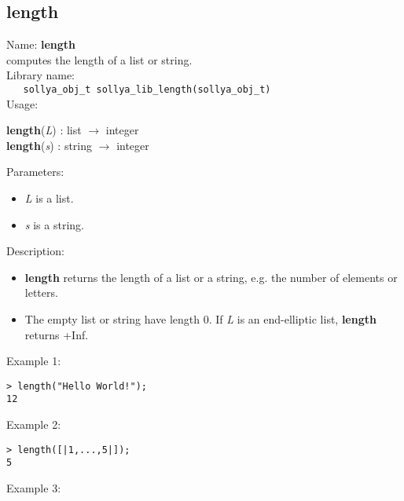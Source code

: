 \subsection{length}
\label{lablength}
\noindent Name: \textbf{length}\\
\phantom{aaa}computes the length of a list or string.\\[0.2cm]
\noindent Library name:\\
\verb|   sollya_obj_t sollya_lib_length(sollya_obj_t)|\\[0.2cm]
\noindent Usage: 
\begin{center}
\textbf{length}(\emph{L}) : \textsf{list} $\rightarrow$ \textsf{integer}\\
\textbf{length}(\emph{s}) : \textsf{string} $\rightarrow$ \textsf{integer}\\
\end{center}
Parameters: 
\begin{itemize}
\item \emph{L} is a list.
\item \emph{s} is a string.
\end{itemize}
\noindent Description: \begin{itemize}

\item \textbf{length} returns the length of a list or a string, e.g. the number of elements
   or letters.

\item The empty list or string have length 0.
   If \emph{L} is an end-elliptic list, \textbf{length} returns +Inf.
\end{itemize}
\noindent Example 1: 
\begin{center}\begin{minipage}{15cm}\begin{Verbatim}[frame=single,commandchars=\\\|\~]
> length("Hello World!");
12
\end{Verbatim}
\end{minipage}\end{center}
\noindent Example 2: 
\begin{center}\begin{minipage}{15cm}\begin{Verbatim}[frame=single,commandchars=\\\|\~]
> length([|1,...,5|]);
5
\end{Verbatim}
\end{minipage}\end{center}
\noindent Example 3: 
